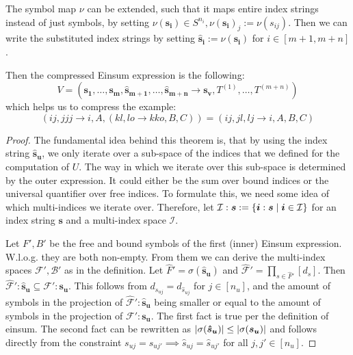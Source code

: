 \begin{theorem}
    The symbol map $\nu$ can be extended, such that it maps entire index strings instead of just symbols, by setting $\nu(\bm{s_i}) \in S^{n_i}, \nu(\bm{s_i})_j := \nu(s_{ij})$.
    Then we can write the substituted index strings by setting $\bm{\hat{s}_i} := \nu(\bm{s_i})$ for $i \in [m + 1, m + n]$.

    Then the compressed Einsum expression is the following:
    $$V = (\bm{s_1},\dots,\bm{s_m}, \bm{\hat{s}_{m + 1}}, \dots, \bm{\hat{s}_{m + n}} \rightarrow \bm{s_v}, T^{(1)},\dots,T^{(m + n)})$$
    which helps us to compress the example:
    $$(ij, jjj \rightarrow i, A, (kl, lo \rightarrow kko, B, C)) = (ij, jl, lj \rightarrow i, A, B, C)$$
\end{theorem}

\begin{proof}
    \small
    The fundamental idea behind this theorem is, that by using the index string $\bm{\hat{s}_u}$, we only iterate over a sub-space of the indices that we defined for the computation of $U$.
    The way in which we iterate over this sub-space is determined by the outer expression.
    It could either be the sum over bound indices or the universal quantifier over free indices.
    To formulate this, we need some idea of which multi-indices we iterate over.
    Therefore, let $\mathcal{I}:\bm{s} := \lbrace \bm{i}: \bm{s} \mid \bm{i} \in \mathcal{I} \rbrace$ for an index string $\bm{s}$ and a multi-index space $\mathcal{I}$.

    Let $F', B'$ be the free and bound symbols of the first (inner) Einsum expression.
    W.l.o.g. they are both non-empty.
    From them we can derive the multi-index spaces $\mathcal{F}', \mathcal{B}'$ as in the definition.
    Let $\hat{F}' = \sigma(\bm{\hat{s}_u})$ and $\mathcal{\hat{F}}' = \prod_{s \in \hat{F}'} [d_s]$.
    Then $\mathcal{\hat{F}}':\bm{\hat{s}_u} \subseteq \mathcal{F}':\bm{s_u}$.
    This follows from $d_{s_{uj}} = d_{\hat{s}_{uj}}$ for $j \in [n_u]$,
    and the amount of symbols in the projection of $\mathcal{\hat{F}}':\bm{\hat{s}_u}$ being smaller or equal to the amount of symbols in the projection of $\mathcal{F}':\bm{s_u}$.
    The first fact is true per the definition of einsum.
    The second fact can be rewritten as $\left| \sigma(\bm{\hat{s}_u}) \right| \leq \left| \sigma(\bm{s_u}) \right|$ and follows directly from the constraint $s_{uj} = s_{uj'} \implies \hat{s}_{uj} = \hat{s}_{uj'}$ for all $j,j' \in [n_u]$.


\end{proof}
